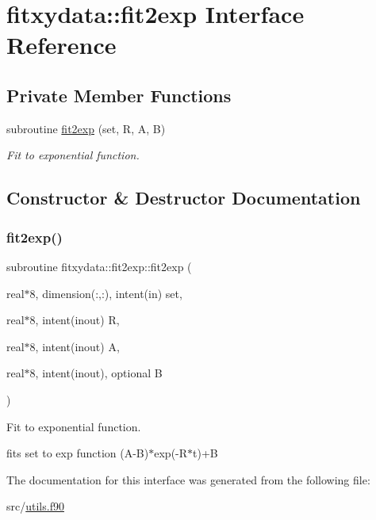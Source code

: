 \hypertarget{interfacefitxydata_1_1fit2exp}{}\section{fitxydata\+:\+:fit2exp Interface Reference}
\label{interfacefitxydata_1_1fit2exp}
\subsection*{Private Member Functions}
\begin{DoxyCompactItemize}
\item 
subroutine \hyperlink{interfacefitxydata_1_1fit2exp_a73b64486284b328876b36875d2006a98}{fit2exp} (set, R, A, B)
\begin{DoxyCompactList}\small\item\em Fit to exponential function. \end{DoxyCompactList}\end{DoxyCompactItemize}


\subsection{Constructor \& Destructor Documentation}
\mbox{\label{interfacefitxydata_1_1fit2exp_a73b64486284b328876b36875d2006a98}} 
\subsubsection{\texorpdfstring{fit2exp()}{fit2exp()}}
{\footnotesize\ttfamily subroutine fitxydata\+::fit2exp\+::fit2exp (\begin{DoxyParamCaption}\item[{real$\ast$8, dimension(\+:,\+:), intent(in)}]{set,  }\item[{real$\ast$8, intent(inout)}]{R,  }\item[{real$\ast$8, intent(inout)}]{A,  }\item[{real$\ast$8, intent(inout), optional}]{B }\end{DoxyParamCaption})\hspace{0.3cm}{\ttfamily [private]}}



Fit to exponential function. 

fits set to exp function (A-\/B)$\ast$exp(-\/\+R$\ast$t)+B 

The documentation for this interface was generated from the following file\+:\begin{DoxyCompactItemize}
\item 
src/\hyperlink{utils_8f90}{utils.\+f90}\end{DoxyCompactItemize}
